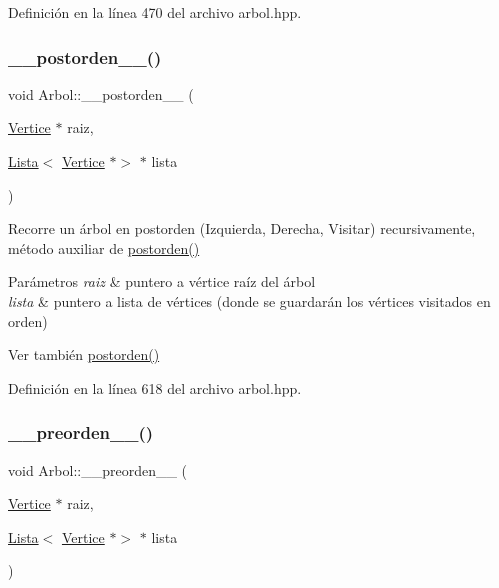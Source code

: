 Definición en la línea 470 del archivo arbol.\+hpp.

\mbox{\label{classArbol_aea4cc9147a79d74956413a233df1dbe0}} 
\subsubsection{\texorpdfstring{\+\_\+\+\_\+postorden\+\_\+\+\_\+()}{\_\_postorden\_\_()}}
{\footnotesize\ttfamily void Arbol\+::\+\_\+\+\_\+postorden\+\_\+\+\_\+ (\begin{DoxyParamCaption}\item[{\hyperlink{classVertice}{Vertice} $\ast$}]{raiz,  }\item[{\hyperlink{classLista}{Lista}$<$ \hyperlink{classVertice}{Vertice} $\ast$$>$ $\ast$}]{lista }\end{DoxyParamCaption})\hspace{0.3cm}{\ttfamily [protected]}}



Recorre un árbol en postorden (Izquierda, Derecha, Visitar) recursivamente, método auxiliar de \hyperlink{classArbol_a126e7d801dbe214ac39f183c26e9135d}{postorden()} 


\begin{DoxyParams}{Parámetros}
{\em raiz} & puntero a vértice raíz del árbol \\
\hline
{\em lista} & puntero a lista de vértices (donde se guardarán los vértices visitados en orden) \\
\hline
\end{DoxyParams}
\begin{DoxySeeAlso}{Ver también}
\hyperlink{classArbol_a126e7d801dbe214ac39f183c26e9135d}{postorden()} 
\end{DoxySeeAlso}


Definición en la línea 618 del archivo arbol.\+hpp.

\mbox{\label{classArbol_a707f748c57d51f6b63fe1a605476e49d}} 
\subsubsection{\texorpdfstring{\+\_\+\+\_\+preorden\+\_\+\+\_\+()}{\_\_preorden\_\_()}}
{\footnotesize\ttfamily void Arbol\+::\+\_\+\+\_\+preorden\+\_\+\+\_\+ (\begin{DoxyParamCaption}\item[{\hyperlink{classVertice}{Vertice} $\ast$}]{raiz,  }\item[{\hyperlink{classLista}{Lista}$<$ \hyperlink{classVertice}{Vertice} $\ast$$>$ $\ast$}]{lista }\end{DoxyParamCaption})\hspace{0.3cm}{\ttfamily [protected]}}



